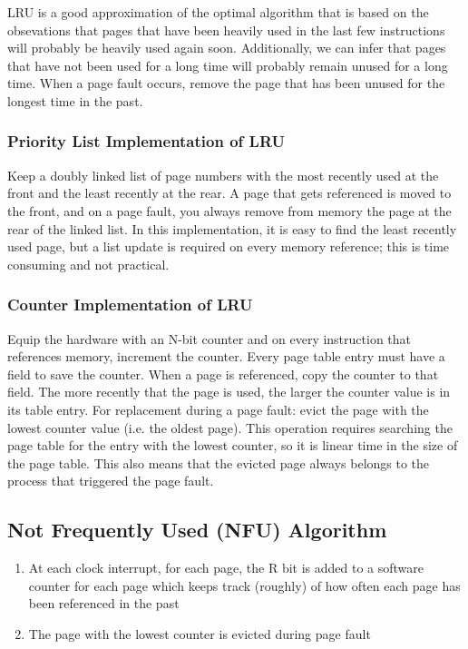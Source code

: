 \documentclass{article}
\begin{document}
LRU is a good approximation of the optimal algorithm that is based on the obsevations that pages that have been heavily used in the last few instructions will probably be heavily used again soon. Additionally, we can infer that pages that have not been used for a long time will probably remain unused for a long time. When a page fault occurs, remove the page that has been unused for the longest time in the past. 

\subsubsection{Priority List Implementation of LRU}

Keep a doubly linked list of page numbers with the most recently used at the front and the least recently at the rear. A page that gets referenced is moved to the front, and on a page fault, you always remove from memory the page at the rear of the linked list. In this implementation, it is easy to find the least recently used page, but a list update is required on every memory reference; this is time consuming and not practical. 

\subsubsection{Counter Implementation of LRU}

Equip the hardware with an N-bit counter and on every instruction that references memory, increment the counter. Every page table entry must have a field to save the counter. When a page is referenced, copy the counter to that field. The more recently that the page is used, the larger the counter value is in its table entry. For replacement during a page fault: evict the page with the lowest counter value (i.e. the oldest page). This operation requires searching the page table for the entry with the lowest counter, so it is linear time in the size of the page table. This also means that the evicted page always belongs to the process that triggered the page fault.

\subsection{Not Frequently Used (NFU) Algorithm}

\begin{enumerate}
    \item At each clock interrupt, for each page, the R bit is added to a software counter for each page which keeps track (roughly) of how often each page has been referenced in the past 
    \item The page with the lowest counter is evicted during page fault
\end{enumerate}
\end{document}
